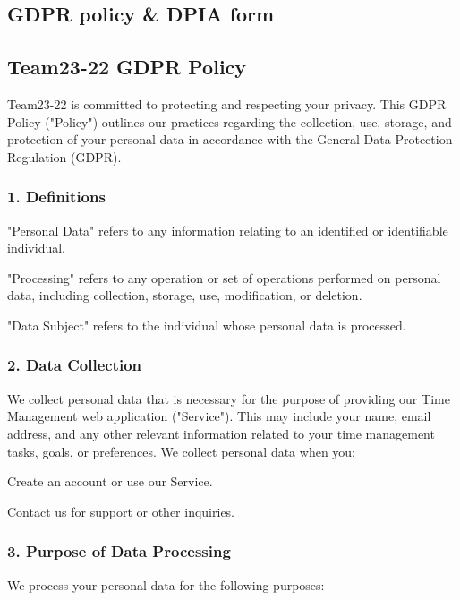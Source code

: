 \documentclass[a4paper]{article}
\begin{document}
\newpage

\begin{tcolorbox}[colback=gray!20, sharp corners, boxrule=0pt, boxsep=0pt, left=5pt, right=5pt, top=5pt, bottom=5pt]
\section{GDPR policy \& DPIA form}

\subsection{Team23-22 GDPR Policy}

Team23-22 is committed to protecting and respecting your privacy. This GDPR Policy ("Policy") outlines our practices regarding the collection, use, storage, and protection of your personal data in accordance with the General Data Protection Regulation (GDPR).

\subsubsection*{1. Definitions}
"Personal Data" refers to any information relating to an identified or identifiable individual.

"Processing" refers to any operation or set of operations performed on personal data, including collection, storage, use, modification, or deletion.

"Data Subject" refers to the individual whose personal data is processed.

\subsubsection*{2. Data Collection}
We collect personal data that is necessary for the purpose of providing our Time Management web application ("Service"). This may include your name, email address, and any other relevant information related to your time management tasks, goals, or preferences. We collect personal data when you:

Create an account or use our Service.

Contact us for support or other inquiries.

\subsubsection*{3. Purpose of Data Processing}
We process your personal data for the following purposes:


\end{tcolorbox}
\end{document}

